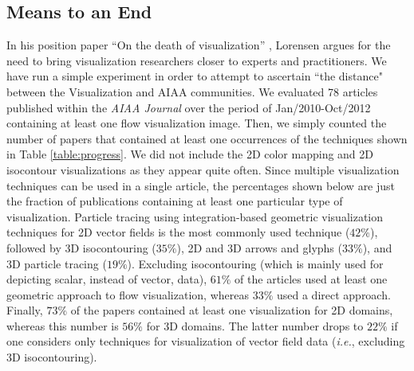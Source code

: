 \subsection{Means to an End}
In his position paper ``On the death of visualization'' \cite{citeulike:4186603}, Lorensen argues for the need to bring visualization researchers closer to experts and practitioners. 
%
We have run a simple experiment in order to attempt to ascertain ``the distance" between the Visualization and AIAA communities.
%
We evaluated 78 articles published within the {\em AIAA Journal} over the period of Jan/2010-Oct/2012 containing at least one flow visualization image. 
%
Then, we simply counted the number of papers that contained at least one occurrences of the techniques shown in Table \ref{table:progress}. 
%
We did not include the 2D color mapping and 2D isocontour visualizations as they appear quite often. 
%
Since multiple visualization techniques can be used in a single article, the percentages shown below are just the fraction of publications containing at least one particular type of visualization.
%
Particle tracing using integration-based geometric visualization techniques for 2D vector fields is the most commonly used technique ($42\%$), followed by 3D isocontouring ($35\%$), 2D and 3D arrows and glyphs ($33\%$), and 3D particle tracing ($19\%$). 
% 
Excluding isocontouring (which is mainly used for depicting scalar, instead of vector, data), $61\%$ of the articles used at least one geometric approach to flow visualization, whereas $33\%$ used a direct approach. 
%
Finally, $73\%$ of the papers contained at least one visualization for 2D domains, whereas this number is $56\%$ for 3D domains. 
%
The latter number drops to $22\%$ if one considers only techniques for visualization of vector field data (\emph{i.e.}, excluding 3D isocontouring).

